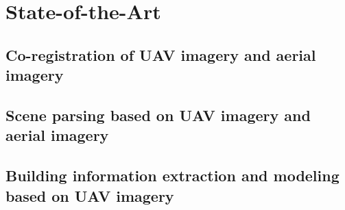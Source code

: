 \chapter{State-of-the-Art}
\label{ch:review}

\section{Co-registration of UAV imagery and aerial imagery}
\label{re_coregi}
\subsection{}

\section{Scene parsing based on UAV imagery and aerial imagery}
\label{re_seg}


\section{Building information extraction and modeling based on UAV imagery}
\label{re_build}